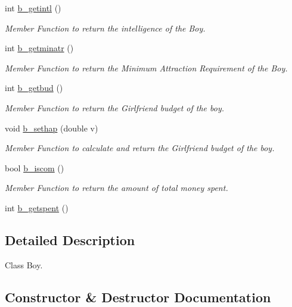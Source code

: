 \begin{DoxyCompactItemize}
int \hyperlink{class_b_o_y_ab9fa5b1b234e7dbecc6a03eb213cd49c}{b\+\_\+getintl} ()
\begin{DoxyCompactList}\small\item\em Member Function to return the intelligence of the Boy. \end{DoxyCompactList}\item 
int \hyperlink{class_b_o_y_ac1713c5815f12a9f8ef5387e7c87534a}{b\+\_\+getminatr} ()
\begin{DoxyCompactList}\small\item\em Member Function to return the Minimum Attraction Requirement of the Boy. \end{DoxyCompactList}\item 
int \hyperlink{class_b_o_y_aadf93fc608732bbe0f1d72711fc25a7f}{b\+\_\+getbud} ()
\begin{DoxyCompactList}\small\item\em Member Function to return the Girlfriend budget of the boy. \end{DoxyCompactList}\item 
void \hyperlink{class_b_o_y_a7467385e7e4535bf141d5cf20dba30f7}{b\+\_\+sethap} (double v)
\begin{DoxyCompactList}\small\item\em Member Function to calculate and return the Girlfriend budget of the boy. \end{DoxyCompactList}\item 
bool \hyperlink{class_b_o_y_a3ca1bdc662f17f4d25c1faec837d277d}{b\+\_\+iscom} ()
\begin{DoxyCompactList}\small\item\em Member Function to return the amount of total money spent. \end{DoxyCompactList}\item 
int \hyperlink{class_b_o_y_ae37d20080792ee3ccb4249431fc5e6a6}{b\+\_\+getspent} ()
\end{DoxyCompactItemize}


\subsection{Detailed Description}
Class Boy. 

\subsection{Constructor \& Destructor Documentation}
\mbox{\label{class_b_o_y_ac91c821a01f28ed38f374951c586b29b}} 
